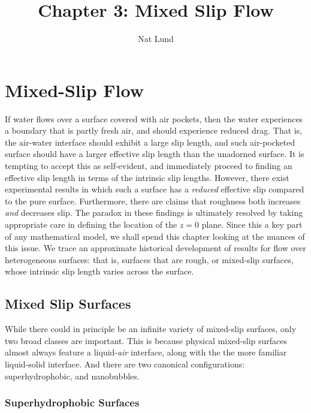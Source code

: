 \documentclass[12pt, a4paper, twoside, openright]{book}
\title{Chapter 3: Mixed Slip Flow}
\author{Nat Lund}
\begin{document}
\chapter{Mixed-Slip Flow}

If water flows over a surface covered with air pockets, then the water experiences a boundary that is partly fresh air, and should experience reduced drag.  That is, the air-water interface should exhibit a large slip length, and such air-pocketed  surface should have a larger effective slip length than the unadorned surface.  It is tempting to accept this as self-evident, and immediately proceed to finding an effective slip length in terms of the intrinsic slip lengths.  However, there exist experimental results in which such a surface has a \emph{reduced} effective slip compared to the pure surface.  Furthermore, there are claims that roughness both increases \emph{and} decreases slip.  The paradox in these findings is ultimately resolved by taking appropriate care in defining the location of the $z=0$ plane.  Since this a key part of any mathematical model, we shall spend this chapter looking at the nuances of this issue.  We trace an approximate historical development of results for flow over heterogeneous surfaces: that is, surfaces that are rough, or mixed-slip surfaces,  whose intrinsic slip length varies across the surface.


\section{Mixed Slip Surfaces}

While there could in principle be an infinite variety of mixed-slip surfaces, only two broad classes are important.  This is because physical mixed-slip surfaces almost always feature a liquid-\emph{air} interface, along with the the more familiar liquid-solid interface.  And there are two canonical configurations: superhydrophobic, and nanobubbles.

\subsection{Superhydrophobic Surfaces}
\end{document}
